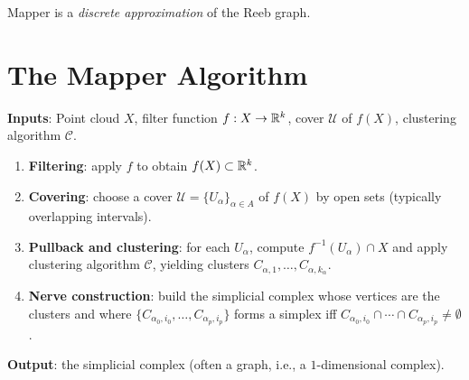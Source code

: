 Mapper is a \emph{discrete approximation} of the Reeb graph.

\section{The Mapper Algorithm}

\begin{algorithme}[title=\textbf{Mapper Algorithm (Singh, M\'emoli, Carlsson, 2007)}]
\textbf{Inputs}: Point cloud $X$, filter function $f : X \to \mathbb{R}^k$,
cover $\mathcal{U}$ of $f(X)$, clustering algorithm $\mathcal{C}$.

\begin{enumerate}
  \item \textbf{Filtering}: apply $f$ to obtain $f(X) \subset \mathbb{R}^k$.
  \item \textbf{Covering}: choose a cover
        $\mathcal{U} = \{U_\alpha\}_{\alpha \in A}$ of $f(X)$ by open
        sets (typically overlapping intervals).
  \item \textbf{Pullback and clustering}: for each $U_\alpha$, compute
        $f^{-1}(U_\alpha) \cap X$ and apply clustering algorithm
        $\mathcal{C}$, yielding clusters
        $C_{\alpha,1}, \ldots, C_{\alpha, k_\alpha}$.
  \item \textbf{Nerve construction}: build the simplicial complex whose
        vertices are the clusters and where
        $\{C_{\alpha_0, i_0}, \ldots, C_{\alpha_p, i_p}\}$ forms a
        simplex iff
        $C_{\alpha_0, i_0} \cap \cdots \cap C_{\alpha_p, i_p} \neq \emptyset$.
\end{enumerate}
\textbf{Output}: the simplicial complex (often a graph, i.e., a
$1$-dimensional complex).
\end{algorithme}

